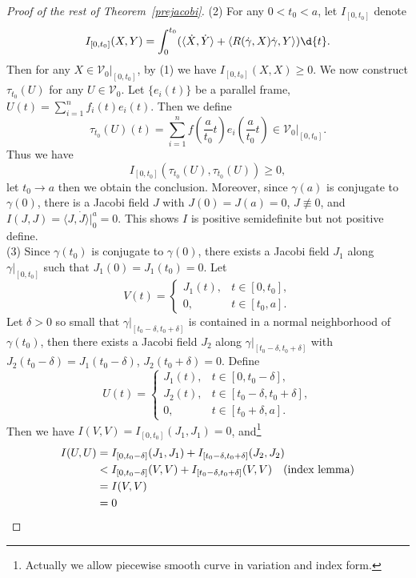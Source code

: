 \begin{proof}[Proof of the rest of Theorem~\ref{prejacobi}]
    (2) For any $0<t_0<a$, let $I_{[0,t_0]}$ denote
    \[I_{[0,t_0]}(X,Y)=\int_0^{t_0}(\langle\dot{X},\dot{Y}\rangle+\langle R(\dot{\gamma},X)\dot{\gamma},Y\rangle)\d{t}.\]
    Then for any $X\in\mathscr{V}_0|_{[0,t_0]}$, by (1) we have $I_{[0,t_0]}(X,X)\geq 0$.
    We now construct $\tau_{t_0}(U)$ for any $U\in\mathscr{V}_0$.
    Let $\{e_i(t)\}$ be a parallel frame, $U(t)=\sum_{i=1}^nf_i(t)e_i(t)$.
    Then we define
    \[\tau_{t_0}(U)(t)=\sum_{i=1}^nf\left(\frac{a}{t_0}t\right)e_i\left(\frac{a}{t_0}t\right)\in\mathscr{V}_0|_{[0,t_0]}.\]
    Thus we have
    \[I_{[0,t_0]}(\tau_{t_0}(U),\tau_{t_0}(U))\geq 0,\]
    let $t_0\to a$ then we obtain the conclusion.
    Moreover, since $\gamma(a)$ is conjugate to $\gamma(0)$, there is a Jacobi field $J$ with $J(0)=J(a)=0$, $J\not\equiv 0$, and $I(J,J)=\langle J,\dot{J}\rangle|^a_0=0$.
    This shows $I$ is positive semidefinite but not positive define.\\
    (3) Since $\gamma(t_0)$ is conjugate to $\gamma(0)$, there exists a Jacobi field $J_1$ along $\gamma|_{[0,t_0]}$ such that $J_1(0)=J_1(t_0)=0$.
    Let
    \[V(t)=\begin{cases}
        J_1(t), & t\in[0,t_0],\\
        0, & t\in[t_0,a].
    \end{cases}\]
    Let $\delta>0$ so small that $\gamma|_{[t_0-\delta,t_0+\delta]}$ is contained in a normal neighborhood of $\gamma(t_0)$, then there exists a Jacobi field $J_2$ along $\gamma|_{[t_0-\delta,t_0+\delta]}$ with $J_2(t_0-\delta)=J_1(t_0-\delta)$, $J_2(t_0+\delta)=0$.
    Define
    \[U(t)=\begin{cases}
        J_1(t), & t\in[0,t_0-\delta],\\
        J_2(t), & t\in[t_0-\delta,t_0+\delta],\\
        0, & t\in[t_0+\delta,a].
    \end{cases}\]
    Then we have $I(V,V)=I_{[0,t_0]}(J_1,J_1)=0$, and\footnote{Actually we allow piecewise smooth curve in variation and index form.}
    \begin{align*}
        I(U,U)&=I_{[0,t_0-\delta]}(J_1,J_1)+I_{[t_0-\delta,t_0+\delta]}(J_2,J_2)\\
        &<I_{[0,t_0-\delta]}(V,V)+I_{[t_0-\delta,t_0+\delta]}(V,V)\quad\text{(index lemma)}\\
        &=I(V,V)\\
        &=0\qedhere
    \end{align*}
\end{proof}


